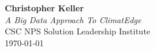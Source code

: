 \begin{titlepage}
    \vspace*{\fill}
    \begin{center}
        \textbf{\Large Christopher Keller}\\[1cm]
        \textit{A Big Data Approach To ClimatEdge\texttrademark{}}\\ [.5cm]
         CSC NPS Solution Leadership Institute\\ [.5cm]
        \today
    \end{center}
    \vspace*{\fill}
\end{titlepage}

